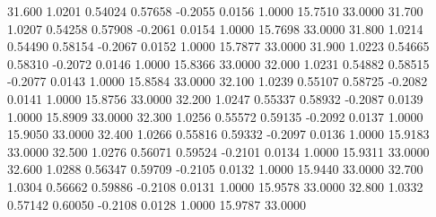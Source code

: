   31.600   1.0201   0.54024   0.57658  -0.2055   0.0156   1.0000  15.7510  33.0000
  31.700   1.0207   0.54258   0.57908  -0.2061   0.0154   1.0000  15.7698  33.0000
  31.800   1.0214   0.54490   0.58154  -0.2067   0.0152   1.0000  15.7877  33.0000
  31.900   1.0223   0.54665   0.58310  -0.2072   0.0146   1.0000  15.8366  33.0000
  32.000   1.0231   0.54882   0.58515  -0.2077   0.0143   1.0000  15.8584  33.0000
  32.100   1.0239   0.55107   0.58725  -0.2082   0.0141   1.0000  15.8756  33.0000
  32.200   1.0247   0.55337   0.58932  -0.2087   0.0139   1.0000  15.8909  33.0000
  32.300   1.0256   0.55572   0.59135  -0.2092   0.0137   1.0000  15.9050  33.0000
  32.400   1.0266   0.55816   0.59332  -0.2097   0.0136   1.0000  15.9183  33.0000
  32.500   1.0276   0.56071   0.59524  -0.2101   0.0134   1.0000  15.9311  33.0000
  32.600   1.0288   0.56347   0.59709  -0.2105   0.0132   1.0000  15.9440  33.0000
  32.700   1.0304   0.56662   0.59886  -0.2108   0.0131   1.0000  15.9578  33.0000
  32.800   1.0332   0.57142   0.60050  -0.2108   0.0128   1.0000  15.9787  33.0000
